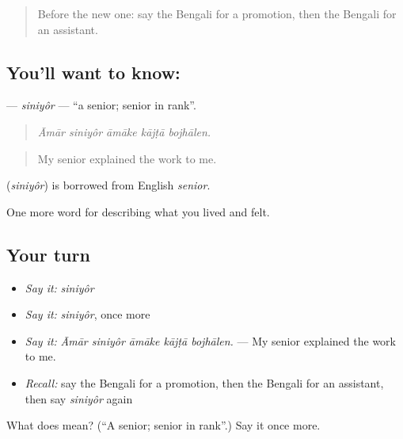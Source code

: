 \begin{quote}
Before the new one: say the Bengali for a promotion, then the Bengali for an assistant.
\end{quote}

\subsection*{You'll want to know: }
\textbf{} — \emph{siniyôr} — \textquotedblleft{}a senior; senior in rank\textquotedblright{}.

\begin{quote}
    
\end{quote}

\begin{quote}
\emph{Āmār siniyôr āmāke kājṭā bojhālen.}
\end{quote}

\begin{quote}
My senior explained the work to me.
\end{quote}

\begin{cousinweb}
\textbf{} (\emph{siniyôr}) is borrowed from English \emph{senior}.
\end{cousinweb}

\begin{grammarlens}[title={What you've built}]
One more word for describing what you lived and felt.
\end{grammarlens}

\subsection*{Your turn}
\begin{itemize}
\raggedright
  \item \emph{Say it:} \emph{siniyôr}
  \item \emph{Say it:} \emph{siniyôr}, once more
  \item \emph{Say it:} \emph{Āmār siniyôr āmāke kājṭā bojhālen.} — My senior explained the work to me.
  \item \emph{Recall:} say the Bengali for a promotion, then the Bengali for an assistant, then say \emph{siniyôr} again
\end{itemize}

\begin{tcolorbox}[breakable,colback=teal!4,colframe=teal!35!black,title={Before you move on}]
What does  mean? (\textquotedblleft{}A senior; senior in rank\textquotedblright{}.) Say it once more.
\end{tcolorbox}

